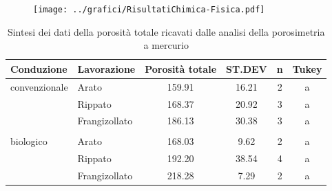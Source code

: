 \documentclass[10pt]{beamer}
\begin{document}
\appendix

\begin{frame}
\vspace{1.5cm}
\begin{figure}
\centering
\texttt{[image: ../grafici/RisultatiChimica-Fisica.pdf]}
\end{figure}
\end{frame}

\begin{frame}
\begin{table}[ht]
\centering
\caption{Sintesi dei dati della porosit\`a totale ricavati dalle analisi della porosimetria a mercurio} 
\label{tab:tot_sommario}
\begin{tabular}{llcccc}
  \hline
Conduzione & Lavorazione & Porosità totale & ST.DEV & n & Tukey \\ 
  \hline
convenzionale & Arato & 159.91 & 16.21 &   2 & a \\ 
   & Rippato & 168.37 & 20.92 &   3 & a \\ 
   & Frangizollato & 186.13 & 30.38 &   3 & a \\ 
   &  &  &  &  &  \\ 
  biologico & Arato & 168.03 & 9.62 &   2 & a \\ 
   & Rippato & 192.20 & 38.54 &   4 & a \\ 
   & Frangizollato & 218.28 & 7.29 &   2 & a \\ 
   \hline
\end{tabular}
\end{table}
\end{frame}
\end{document}
